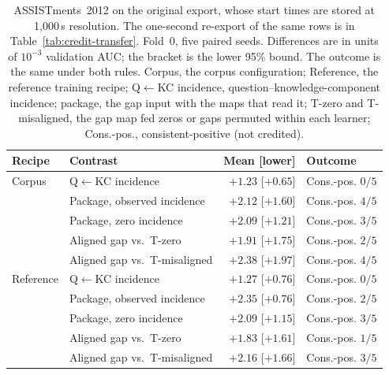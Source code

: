 \begin{table}[H]
\caption{ASSISTments~2012 on the original export, whose start times
are stored at 1{,}000\,s resolution. The one-second re-export of the
same rows is in Table~\ref{tab:credit-transfer}. Fold~0, five paired
seeds. Differences are in units of $10^{-3}$ validation AUC; the
bracket is the lower 95\% bound. The outcome is the same under both
rules. Corpus, the corpus configuration;
Reference, the reference training recipe; Q$\leftarrow$KC incidence,
question--knowledge-component incidence; package, the gap input with
the maps that read it; T-zero and T-misaligned, the gap map fed zeros
or gaps permuted within each learner; Cons.-pos., consistent-positive
(not credited).}
\label{tab:credit-assist-resolution}
\centering
\scriptsize
\setlength{\tabcolsep}{3pt}
\begin{tabular}{@{}llrl@{}}
\toprule
Recipe & Contrast & Mean [lower] & Outcome \\
\midrule
Corpus & Q$\leftarrow$KC incidence & $+1.23$ [$+0.65$] & Cons.-pos. $0/5$ \\
 & Package, observed incidence & $+2.12$ [$+1.60$] & Cons.-pos. $4/5$ \\
 & Package, zero incidence & $+2.09$ [$+1.21$] & Cons.-pos. $3/5$ \\
 & Aligned gap vs.\ T-zero & $+1.91$ [$+1.75$] & Cons.-pos. $2/5$ \\
 & Aligned gap vs.\ T-misaligned & $+2.38$ [$+1.97$] & Cons.-pos. $4/5$ \\
\addlinespace
Reference & Q$\leftarrow$KC incidence & $+1.27$ [$+0.76$] & Cons.-pos. $0/5$ \\
 & Package, observed incidence & $+2.35$ [$+0.76$] & Cons.-pos. $2/5$ \\
 & Package, zero incidence & $+2.09$ [$+1.15$] & Cons.-pos. $3/5$ \\
 & Aligned gap vs.\ T-zero & $+1.83$ [$+1.61$] & Cons.-pos. $1/5$ \\
 & Aligned gap vs.\ T-misaligned & $+2.16$ [$+1.66$] & Cons.-pos. $3/5$ \\
\bottomrule
\end{tabular}
\end{table}
